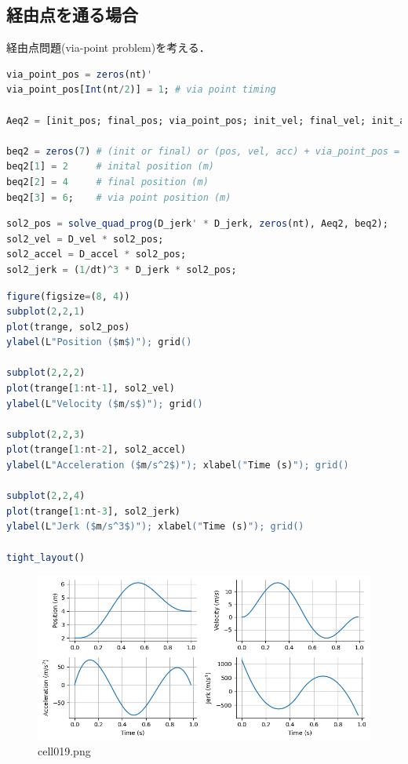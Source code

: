 \subsection{経由点を通る場合}
経由点問題(via-point problem)を考える．
\begin{lstlisting}[language=julia]
via_point_pos = zeros(nt)'
via_point_pos[Int(nt/2)] = 1; # via point timing

Aeq2 = [init_pos; final_pos; via_point_pos; init_vel; final_vel; init_accel; final_accel];

beq2 = zeros(7) # (init or final) or (pos, vel, acc) + via_point_pos = 2*3 + 1 = 7 
beq2[1] = 2     # inital position (m)
beq2[2] = 4     # final position (m)
beq2[3] = 6;    # via point position (m)
\end{lstlisting}
\begin{lstlisting}[language=julia]
sol2_pos = solve_quad_prog(D_jerk' * D_jerk, zeros(nt), Aeq2, beq2);
sol2_vel = D_vel * sol2_pos;
sol2_accel = D_accel * sol2_pos;
sol2_jerk = (1/dt)^3 * D_jerk * sol2_pos;
\end{lstlisting}
\begin{lstlisting}[language=julia]
figure(figsize=(8, 4))
subplot(2,2,1)
plot(trange, sol2_pos)
ylabel(L"Position ($m$)"); grid()

subplot(2,2,2)
plot(trange[1:nt-1], sol2_vel)
ylabel(L"Velocity ($m/s$)"); grid()

subplot(2,2,3)
plot(trange[1:nt-2], sol2_accel)
ylabel(L"Acceleration ($m/s^2$)"); xlabel("Time (s)"); grid()

subplot(2,2,4)
plot(trange[1:nt-3], sol2_jerk)
ylabel(L"Jerk ($m/s^3$)"); xlabel("Time (s)"); grid()

tight_layout()
\end{lstlisting}
\begin{figure}[ht]
	\centering
	\includegraphics[scale=0.8, max width=\linewidth]{./fig/motor-learning/minimum-jerk/cell019.png}
	\caption{cell019.png}
	\label{cell019.png}
\end{figure}
